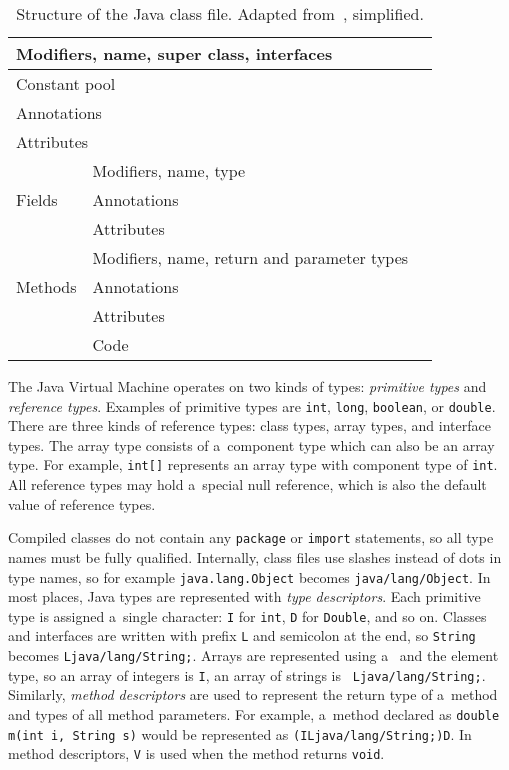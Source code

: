 \begin{table}[h]
    \begin{center}
        \label{classfile}
        \begin{tabular}{|l|l|l|}
            \hline
            \multicolumn{2}{|l|}{Modifiers, name, super class, interfaces} \\
            \hline
            \multicolumn{2}{|l|}{Constant pool} \\
            \hline
            \multicolumn{2}{|l|}{Annotations} \\
            \hline
            \multicolumn{2}{|l|}{Attributes} \\
            \hline
            \multirow{3}{*}{Fields} & Modifiers, name, type \\
            & Annotations \\
            & Attributes \\
            \hline
            \multirow{3}{*}{Methods} & Modifiers, name, return and parameter types \\
            & Annotations \\
            & Attributes \\
            & Code \\
            \hline
        \end{tabular}
        \caption{Structure of the Java class file. Adapted from~\cite{asmguide},
        simplified.}
    \end{center}
\end{table}

The Java Virtual Machine operates on two kinds of types: \emph{primitive types}
and \emph{reference types}. Examples of primitive types are \texttt{int},
\texttt{long}, \texttt{boolean}, or \texttt{double}. There are three kinds of
reference types: class types, array types, and interface types. The array type
consists of a~component type which can also be an array type. For example,
\texttt{int[]} represents an array type with component type of \texttt{int}. All
reference types may hold a~special null reference, which is also the default
value of reference types.

Compiled classes do not contain any \texttt{package} or \texttt{import}
statements, so all type names must be fully qualified. Internally, class files
use slashes instead of dots in type names, so for example
\texttt{java.lang.Object} becomes \texttt{java/lang/Object}. In most places,
Java types are represented with \emph{type descriptors}. Each primitive type is
assigned a~single character: \texttt{I} for \texttt{int}, \texttt{D} for
\texttt{Double}, and so on. Classes and interfaces are written with prefix
\texttt{L} and semicolon at the end, so \texttt{String} becomes
\texttt{Ljava/lang/String;}. Arrays are represented using
a~\texttt{\leftbracket} and the element type, so an array of integers is
\texttt{\leftbracket I}, an array of strings is \texttt{\leftbracket
Ljava/lang/String;}. Similarly, \emph{method descriptors} are used to represent
the return type of a~method and types of all method parameters. For example,
a~method declared as \texttt{double m(int i, String s)} would be represented as
\texttt{(ILjava/lang/String;)D}. In method descriptors, \texttt{V} is used when
the method returns \texttt{void}.

